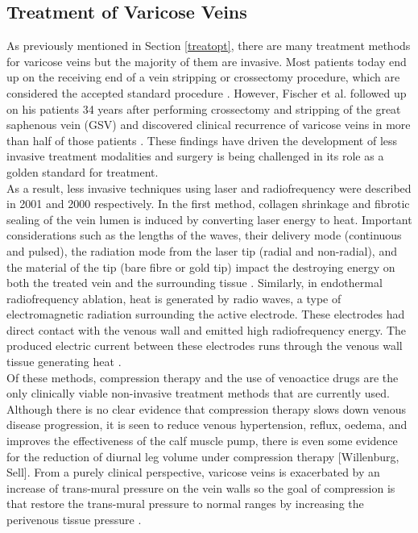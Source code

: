 \documentclass[11.5pt]{article}
\begin{document}
\subsection{Treatment of Varicose Veins}
As previously mentioned in Section \ref{treatopt}, there are many treatment methods for varicose veins but the majority of them are invasive. Most patients today end up on the receiving end of a vein stripping or crossectomy procedure, which are considered the accepted standard procedure \cite{Willenburg}. However, Fischer et al. followed up on his patients 34 years after performing crossectomy and stripping of the great saphenous vein (GSV) and discovered clinical recurrence of varicose veins in more than half of those patients \cite{Willenburg}. These findings have driven the development of less invasive treatment modalities and surgery is being challenged in its role as a golden standard for treatment. \\

As a result, less invasive techniques using laser and radiofrequency were described in 2001 and 2000 respectively. In the first method, collagen shrinkage and fibrotic sealing of the vein lumen is induced by converting laser energy to heat. Important considerations such as the lengths of the waves, their delivery mode (continuous and pulsed), the radiation mode from the laser tip (radial and non-radial), and the material of the tip (bare fibre or gold tip) impact the destroying energy on both the treated vein and the surrounding tissue \cite{Willenburg}. Similarly, in endothermal radiofrequency ablation, heat is generated by radio waves, a type of electromagnetic radiation surrounding the active electrode. These electrodes had direct contact with the venous wall and emitted high radiofrequency energy. The produced electric current between these electrodes runs through the venous wall tissue generating heat \cite{Willenburg}. \\

Of these methods, compression therapy and the use of venoactice drugs are the only clinically viable non-invasive treatment methods that are currently used. Although there is no clear evidence that compression therapy slows down venous disease progression, it is seen to reduce venous hypertension, reflux, oedema, and improves the effectiveness of the calf muscle pump, there is even some evidence for the reduction of diurnal leg volume under compression therapy [Willenburg, Sell]. From a purely clinical perspective, varicose veins is exacerbated by an increase of trans-mural pressure on the vein walls so the goal of compression is that restore the trans-mural pressure to normal ranges by increasing the perivenous tissue pressure \cite{Rohan}.\\
\end{document}
